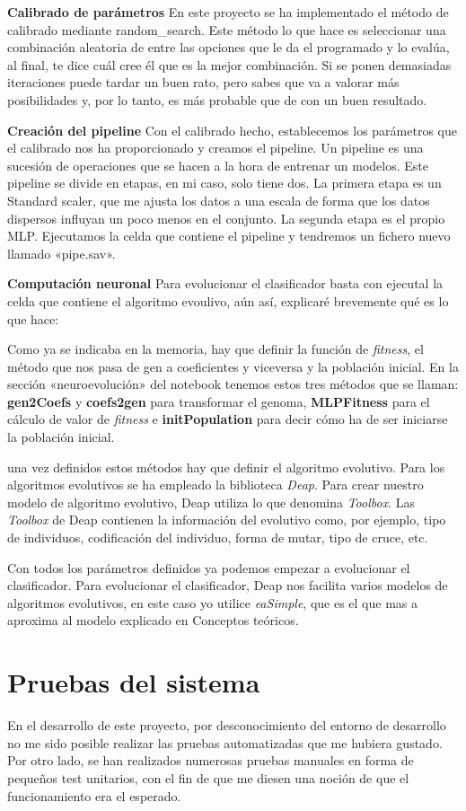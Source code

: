 \textbf{Calibrado de parámetros}
En este proyecto se ha implementado el método de calibrado mediante random\_search. Este método lo que hace es seleccionar una combinación aleatoria de entre las opciones que le da el programado y lo evalúa, al final, te dice cuál cree él que es la mejor combinación. Si se ponen demasiadas iteraciones puede tardar un buen rato, pero sabes que va a valorar más posibilidades y, por lo tanto, es más probable que de con un buen resultado.

\textbf{Creación del pipeline}
Con el calibrado hecho, establecemos los parámetros que el calibrado nos ha proporcionado y creamos el pipeline. Un pipeline es una sucesión de operaciones que se hacen a la hora de entrenar un modelos. Este pipeline se divide en etapas, en mi caso, solo tiene dos. La primera etapa es un Standard scaler, que me ajusta los datos a una escala de forma que los datos dispersos influyan un poco menos en el conjunto. La segunda etapa es el propio MLP. Ejecutamos la celda que contiene el pipeline y tendremos un fichero nuevo llamado «pipe.sav».


\textbf{Computación neuronal}
Para evolucionar el clasificador basta con ejecutal la celda que contiene el algoritmo evoulivo, aún así, explicaré brevemente qué es lo que hace:

Como ya se indicaba en la memoria, hay que definir la función de \emph{fitness}, el método que nos pasa de gen a coeficientes y viceversa y la población inicial. En la sección «neuroevolución» del notebook tenemos estos tres métodos que se llaman: \textbf{gen2Coefs} y \textbf{coefs2gen} para transformar el genoma, \textbf{MLPFitness} para el cálculo de valor de  \emph{fitness} e \textbf{initPopulation} para decir cómo ha de ser iniciarse la población inicial.

una vez definidos estos métodos hay que definir el algoritmo evolutivo. Para los algoritmos evolutivos se ha empleado la biblioteca \emph{Deap}. Para crear nuestro modelo de algoritmo evolutivo, Deap utiliza lo que denomina \emph{Toolbox}. Las \emph{Toolbox} de Deap contienen la información del evolutivo como, por ejemplo, tipo de individuos, codificación del individuo, forma de mutar, tipo de cruce, etc.

Con todos los parámetros definidos ya podemos empezar a evolucionar el clasificador. Para evolucionar el clasificador, Deap nos facilita varios modelos de algoritmos evolutivos, en este caso yo utilice \emph{eaSimple}, que es el que mas a aproxima al modelo explicado en Conceptos teóricos.


\section{Pruebas del sistema}
En el desarrollo de este proyecto, por desconocimiento del entorno de desarrollo no me sido posible realizar las pruebas automatizadas que me hubiera gustado. Por otro lado, se han realizados numerosas pruebas manuales en forma de pequeños test unitarios, con el fin de que me diesen una noción de que el funcionamiento era el esperado.



